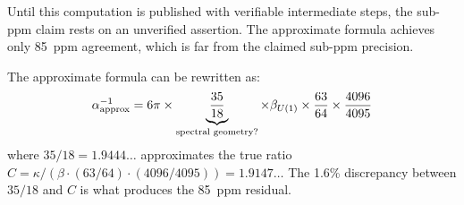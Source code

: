\documentclass[11pt]{article}
\begin{document}
Until this computation is published with verifiable intermediate steps,
the sub-ppm claim rests on an unverified assertion. The approximate
formula achieves only 85~ppm agreement, which is far from the claimed
sub-ppm precision.

The approximate formula can be rewritten as:
\begin{equation}
\alpha^{-1}_{\rm approx} = 6\pi \times
\underbrace{\frac{35}{18}}_{\text{spectral geometry?}}
\times \beta_{U(1)} \times \frac{63}{64} \times \frac{4096}{4095}
\end{equation}
where $35/18 = 1.9444\ldots$ approximates the true ratio
$C = \kappa/(\beta \cdot (63/64) \cdot (4096/4095)) = 1.9147\ldots$
The 1.6\% discrepancy between $35/18$ and $C$ is what produces the
85~ppm residual.
\end{document}
